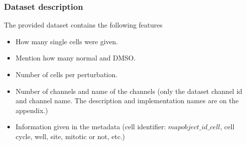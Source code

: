 \subsubsection{Dataset description}

The provided dataset contains the following features

\begin{itemize}
  \item How many single cells were given.
  \item Mention how many normal and DMSO.
  \item Number of cells per perturbation.
  \item Number of channels and name of the channels (only the dataset channel id and channel name. The description and implementation names are on the appendix.)
  \item Information given in the metadata (cell identifier: $mapobject\_id\_cell$, cell cycle, well, site, mitotic or not, etc.)
\end{itemize}


